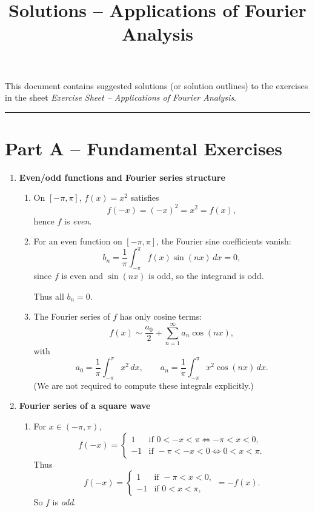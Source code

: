 \documentclass[11pt]{article}
\title{Solutions -- Applications of Fourier Analysis}
\author{}
\date{}
\begin{document}
\maketitle

This document contains suggested solutions (or solution outlines) to the exercises in the sheet
\emph{Exercise Sheet -- Applications of Fourier Analysis}.

\bigskip
\hrule
\bigskip

\section*{Part A -- Fundamental Exercises}

\begin{enumerate}
\item \textbf{Even/odd functions and Fourier series structure}

\begin{enumerate}
\item On $[-\pi,\pi]$, $f(x)=x^2$ satisfies
\[
f(-x)=(-x)^2=x^2=f(x),
\]
hence $f$ is \emph{even}.

\item For an even function on $[-\pi,\pi]$, the Fourier sine coefficients vanish:
\[
b_n = \frac{1}{\pi}\int_{-\pi}^{\pi} f(x)\sin(nx)\,dx = 0,
\]
since $f$ is even and $\sin(nx)$ is odd, so the integrand is odd.

Thus all $b_n=0$.

\item The Fourier series of $f$ has only cosine terms:
\[
f(x) \sim \frac{a_0}{2} + \sum_{n=1}^{\infty} a_n \cos(nx),
\]
with
\[
a_0 = \frac{1}{\pi}\int_{-\pi}^{\pi} x^2\,dx,\qquad
a_n = \frac{1}{\pi}\int_{-\pi}^{\pi} x^2\cos(nx)\,dx.
\]
(We are not required to compute these integrals explicitly.)
\end{enumerate}

\bigskip
\item \textbf{Fourier series of a square wave}

\begin{enumerate}
\item For $x\in(-\pi,\pi)$,
\[
f(-x)=
\begin{cases}
1 & \text{if } 0<-x<\pi \iff -\pi<x<0,\\
-1 & \text{if } -\pi<-x<0 \iff 0<x<\pi.
\end{cases}
\]
Thus
\[
f(-x)=
\begin{cases}
1 & \text{if } -\pi<x<0,\\
-1 & \text{if } 0<x<\pi,
\end{cases}
= -f(x).
\]
So $f$ is \emph{odd}.


\end{enumerate}
\end{enumerate}
\end{document}
